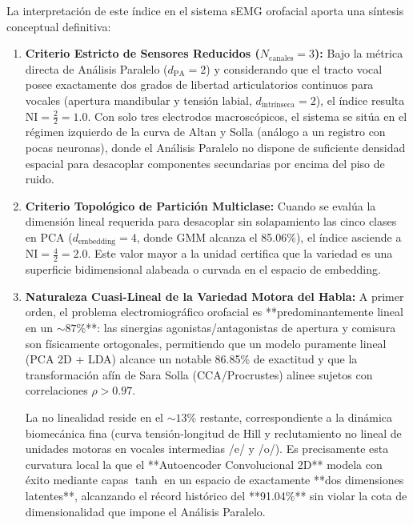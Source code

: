 \documentclass[11pt,a4paper,openany]{book}
\theoremstyle{definition}
\begin{document}
La interpretación de este índice en el sistema sEMG orofacial aporta una síntesis conceptual definitiva:
\begin{enumerate}
    \item \textbf{Criterio Estricto de Sensores Reducidos ($N_{\text{canales}} = 3$):}
    Bajo la métrica directa de Análisis Paralelo ($d_{\text{PA}} = 2$) y considerando que el tracto vocal posee exactamente dos grados de libertad articulatorios continuos para vocales (apertura mandibular y tensión labial, $d_{\text{intrínseca}} = 2$), el índice resulta $\text{NI} = \frac{2}{2} = 1.0$. Con solo tres electrodos macroscópicos, el sistema se sitúa en el régimen izquierdo de la curva de Altan y Solla (análogo a un registro con pocas neuronas), donde el Análisis Paralelo no dispone de suficiente densidad espacial para desacoplar componentes secundarias por encima del piso de ruido.
    
    \item \textbf{Criterio Topológico de Partición Multiclase:}
    Cuando se evalúa la dimensión lineal requerida para desacoplar sin solapamiento las cinco clases en PCA ($d_{\text{embedding}} = 4$, donde GMM alcanza el 85.06\%), el índice asciende a $\text{NI} = \frac{4}{2} = \mathbf{2.0}$. Este valor mayor a la unidad certifica que la variedad es una superficie bidimensional alabeada o curvada en el espacio de embedding.
    
    \item \textbf{Naturaleza Cuasi-Lineal de la Variedad Motora del Habla:}
    A primer orden, el problema electromiográfico orofacial es **predominantemente lineal en un $\sim 87\%$**: las sinergias agonistas/antagonistas de apertura y comisura son físicamente ortogonales, permitiendo que un modelo puramente lineal (PCA 2D + LDA) alcance un notable 86.85\% de exactitud y que la transformación afín de Sara Solla (CCA/Procrustes) alinee sujetos con correlaciones $\rho > 0.97$.
    
    La no linealidad reside en el $\sim 13\%$ restante, correspondiente a la dinámica biomecánica fina (curva tensión-longitud de Hill y reclutamiento no lineal de unidades motoras en vocales intermedias /e/ y /o/). Es precisamente esta curvatura local la que el **Autoencoder Convolucional 2D** modela con éxito mediante capas $\tanh$ en un espacio de exactamente **dos dimensiones latentes**, alcanzando el récord histórico del **91.04\%** sin violar la cota de dimensionalidad que impone el Análisis Paralelo.
\end{enumerate}
\end{document}
